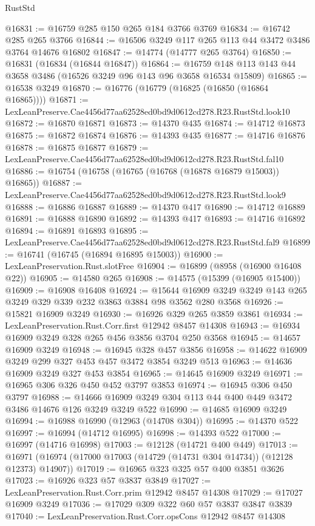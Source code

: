 \begin{lexlean}{RustStd}
\begin{coremodule}
@16831 := @16759 @285 @150 @265 @184 @3766 @3769
@16834 := @16742 @285 @265 @3766
@16844 := @16506 @3249 @117 @265 @113 @44 @3472 @3486 @3764 @14676 @16802
@16847 := @14774 (@14777 @265 @3764)
@16850 := @16831 (@16834 (@16844 @16847))
@16864 := @16759 @148 @113 @143 @44 @3658 @3486 (@16526 @3249 @96 @143 @96 @3658 @16534 @15809)
@16865 := @16538 @3249
@16870 := @16776 (@16779 (@16825 (@16850 (@16864 @16865))))
@16871 := LexLeanPreserve.Cae4456d77aa62528ed0bd9d0612cd278.R23.RustStd.look10
@16872 := @16870 @16871
@16873 := @14370 @435
@16874 := @14712 @16873
@16875 := @16872 @16874
@16876 := @14393 @435
@16877 := @14716 @16876
@16878 := @16875 @16877
@16879 := LexLeanPreserve.Cae4456d77aa62528ed0bd9d0612cd278.R23.RustStd.fal10
@16886 := @16754 (@16758 (@16765 (@16768 (@16878 @16879 @15003)) @16865))
@16887 := LexLeanPreserve.Cae4456d77aa62528ed0bd9d0612cd278.R23.RustStd.look9
@16888 := @16886 @16887
@16889 := @14370 @417
@16890 := @14712 @16889
@16891 := @16888 @16890
@16892 := @14393 @417
@16893 := @14716 @16892
@16894 := @16891 @16893
@16895 := LexLeanPreserve.Cae4456d77aa62528ed0bd9d0612cd278.R23.RustStd.fal9
@16899 := @16741 (@16745 (@16894 @16895 @15003))
@16900 := LexLeanPreservation.Rust.slotFree
@16904 := @16899 (@8958 (@16900 @16408 @22))
@16905 := @14580 @265
@16908 := @14575 (@15399 (@16905 @15400))
@16909 := @16908 @16408
@16924 := @15644 @16909 @3249 @3249 @143 @265 @3249 @329 @339 @232 @3863 @3884 @98 @3562 @280 @3568
@16926 := @15821 @16909 @3249
@16930 := @16926 @329 @265 @3859 @3861
@16934 := LexLeanPreservation.Rust.Corr.first @12942 @8457 @14308
@16943 := @16934 @16909 @3249 @328 @265 @456 @3856 @3704 @250 @3568
@16945 := @14657 @16909 @3249
@16948 := @16945 @328 @457 @3856
@16958 := @14622 @16909 @3249 @299 @327 @453 @457 @3472 @3854 @3249 @513
@16963 := @14636 @16909 @3249 @327 @453 @3854
@16965 := @14645 @16909 @3249
@16971 := @16965 @306 @326 @450 @452 @3797 @3853
@16974 := @16945 @306 @450 @3797
@16988 := @14666 @16909 @3249 @304 @113 @44 @400 @449 @3472 @3486 @14676 @126 @3249 @3249 @522
@16990 := @14685 @16909 @3249
@16994 := @16988 @16990 (@12963 (@14708 @304))
@16995 := @14370 @522
@16997 := @16994 (@14712 @16995)
@16998 := @14393 @522
@17000 := @16997 (@14716 @16998)
@17003 := @12128 (@14721 @400 @449)
@17013 := @16971 (@16974 (@17000 @17003 (@14729 (@14731 @304 @14734)) (@12128 @12373) @14907))
@17019 := @16965 @323 @325 @57 @400 @3851 @3626
@17023 := @16926 @323 @57 @3837 @3849
@17027 := LexLeanPreservation.Rust.Corr.prim @12942 @8457 @14308
@17029 := @17027 @16909 @3249
@17036 := @17029 @309 @322 @60 @57 @3837 @3847 @3839
@17040 := LexLeanPreservation.Rust.Corr.opsCons @12942 @8457 @14308

\end{coremodule}
\end{lexlean}

